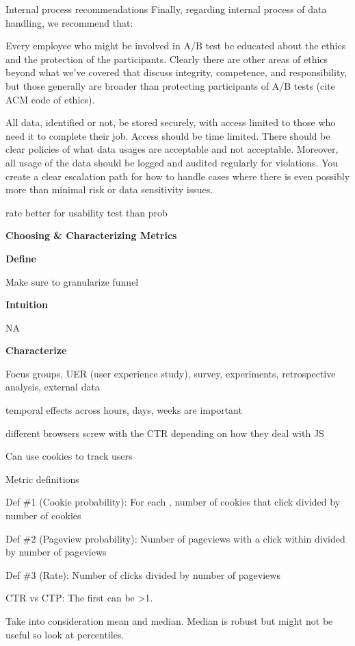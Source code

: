\documentclass[]{book}
\begin{document}
Internal process recommendations Finally, regarding internal process of
data handling, we recommend that:

Every employee who might be involved in A/B test be educated about the
ethics and the protection of the participants. Clearly there are other
areas of ethics beyond what we've covered that discuss integrity,
competence, and responsibility, but those generally are broader than
protecting participants of A/B tests (cite ACM code of ethics).

All data, identified or not, be stored securely, with access limited to
those who need it to complete their job. Access should be time limited.
There should be clear policies of what data usages are acceptable and
not acceptable. Moreover, all usage of the data should be logged and
audited regularly for violations. You create a clear escalation path for
how to handle cases where there is even possibly more than minimal risk
or data sensitivity issues.

rate better for usability test than prob

\textbf{Choosing \& Characterizing Metrics}

\textbf{Define}

Make sure to granularize funnel

\textbf{Intuition}

NA

\textbf{Characterize}

Focus groups, UER (user experience study), survey, experiments,
retrospective analysis, external data

temporal effects across hours, days, weeks are important

different browsers screw with the CTR depending on how they deal with JS

Can use cookies to track users

Metric definitions

Def \#1 (Cookie probability): For each , number of cookies that click
divided by number of cookies

Def \#2 (Pageview probability): Number of pageviews with a click within
divided by number of pageviews

Def \#3 (Rate): Number of clicks divided by number of pageviews

CTR vs CTP: The first can be \textgreater{}1.

Take into consideration mean and median. Median is robust but might not
be useful so look at percentiles.
\end{document}
